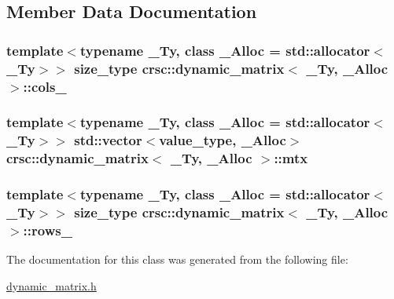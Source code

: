 \subsection{Member Data Documentation}
\subsubsection[{\texorpdfstring{cols\+\_\+}{cols_}}]{\setlength{\rightskip}{0pt plus 5cm}template$<$typename \+\_\+\+Ty, class \+\_\+\+Alloc = std\+::allocator$<$\+\_\+\+Ty$>$$>$ {\bf size\+\_\+type} {\bf crsc\+::dynamic\+\_\+matrix}$<$ \+\_\+\+Ty, \+\_\+\+Alloc $>$\+::cols\+\_\+\hspace{0.3cm}{\ttfamily [private]}}\hypertarget{classcrsc_1_1dynamic__matrix_a350bb926a6e6d0bafcfb05cbf7c7b410}{}\label{classcrsc_1_1dynamic__matrix_a350bb926a6e6d0bafcfb05cbf7c7b410}
\subsubsection[{\texorpdfstring{mtx}{mtx}}]{\setlength{\rightskip}{0pt plus 5cm}template$<$typename \+\_\+\+Ty, class \+\_\+\+Alloc = std\+::allocator$<$\+\_\+\+Ty$>$$>$ std\+::vector$<${\bf value\+\_\+type}, \+\_\+\+Alloc$>$ {\bf crsc\+::dynamic\+\_\+matrix}$<$ \+\_\+\+Ty, \+\_\+\+Alloc $>$\+::mtx\hspace{0.3cm}{\ttfamily [private]}}\hypertarget{classcrsc_1_1dynamic__matrix_a01ba435d0d468b1ff8de25baba9b658c}{}\label{classcrsc_1_1dynamic__matrix_a01ba435d0d468b1ff8de25baba9b658c}
\subsubsection[{\texorpdfstring{rows\+\_\+}{rows_}}]{\setlength{\rightskip}{0pt plus 5cm}template$<$typename \+\_\+\+Ty, class \+\_\+\+Alloc = std\+::allocator$<$\+\_\+\+Ty$>$$>$ {\bf size\+\_\+type} {\bf crsc\+::dynamic\+\_\+matrix}$<$ \+\_\+\+Ty, \+\_\+\+Alloc $>$\+::rows\+\_\+\hspace{0.3cm}{\ttfamily [private]}}\hypertarget{classcrsc_1_1dynamic__matrix_afa3fb44b323d54a0d4c02b2fc00e7357}{}\label{classcrsc_1_1dynamic__matrix_afa3fb44b323d54a0d4c02b2fc00e7357}


The documentation for this class was generated from the following file\+:\begin{DoxyCompactItemize}
\item 
\hyperlink{dynamic__matrix_8h}{dynamic\+\_\+matrix.\+h}\end{DoxyCompactItemize}
